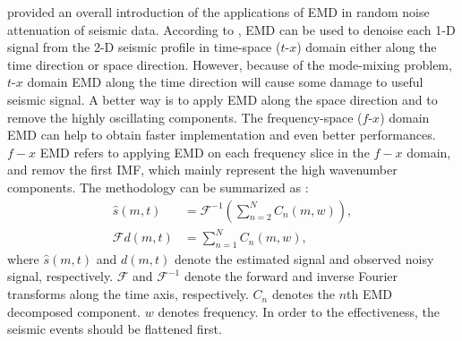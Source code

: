 \cite{yangkang2014emdsum} provided an overall introduction of the applications of EMD in random noise attenuation of seismic data. According to \cite{yangkang2014emdsum}, EMD can be used to denoise each 1-D signal from the 2-D seismic profile in time-space ($t$-$x$) domain either along the time direction or space direction. However, because of the mode-mixing problem, $t$-$x$ domain EMD along the time direction will cause some damage to useful seismic signal. A better way  is to apply EMD along the space direction and to remove the highly oscillating components. The frequency-space ($f$-$x$) domain EMD can help to obtain faster implementation and even better performances. 
$f-x$ EMD refers to applying EMD on
each frequency slice in the $f-x$ domain, and remov the first IMF,
which mainly represent the high wavenumber components. The methodology can be summarized as \cite[]{yangkang2015}:
\begin{equation}
\label{eq:fxemd}
\begin{split}
\hat{s}(m,t) &= \mathcal{F}^{-1}\left(\sum_{n=2}^{N}C_n(m,w)\right), \\
\mathcal{F} d(m,t)  &= \sum_{n=1}^{N} C_n(m,w),
\end{split}
\end{equation}
where $\hat{s}(m,t)$ and $d(m,t)$ denote the estimated signal and observed noisy signal, respectively. $\mathcal{F}$ and $\mathcal{F}^{-1}$ denote the forward and inverse Fourier transforms along the time axis, respectively. $C_n$ denotes the $n$th EMD decomposed component. $w$ denotes frequency. In order to  the effectiveness, the seismic events should  be flattened first.

